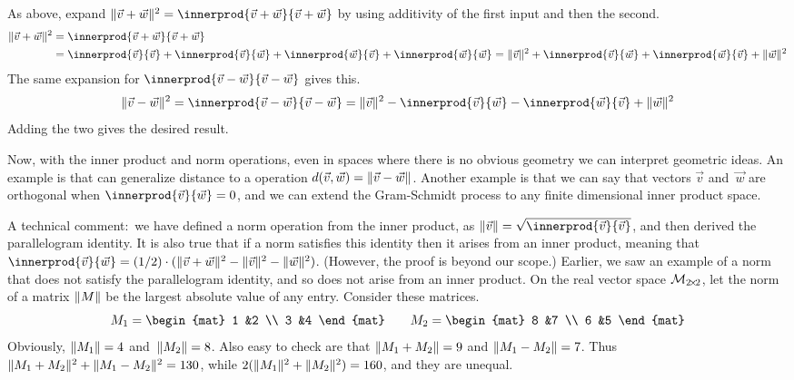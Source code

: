 As above, expand
$
  \norm{\vec{v}+\vec{w}}^2=\innerprod{\vec{v}+\vec{w}}{\vec{v}+\vec{w}}
$
by using additivity of the first input and then the second. 
\begin{align*}
  \norm{\vec{v}+\vec{w}}^2
  &=\innerprod{\vec{v}+\vec{w}}{\vec{v}+\vec{w}}           \\
  &=\innerprod{\vec{v}}{\vec{v}}            
   +\innerprod{\vec{v}}{\vec{w}}
   +\innerprod{\vec{w}}{\vec{v}}
   +\innerprod{\vec{w}}{\vec{w}}
  =\norm{\vec{v}}^2            
   +\innerprod{\vec{v}}{\vec{w}}
   +\innerprod{\vec{w}}{\vec{v}}
   +\norm{\vec{w}}^2
\end{align*}
The same expansion for $\innerprod{\vec{v}-\vec{w}}{\vec{v}-\vec{w}}$
gives this.
\begin{equation*}
  \norm{\vec{v}-\vec{w}}^2
  =\innerprod{\vec{v}-\vec{w}}{\vec{v}-\vec{w}}
  =\norm{\vec{v}}^2
   -\innerprod{\vec{v}}{\vec{w}}
   -\innerprod{\vec{w}}{\vec{v}}
   +\norm{\vec{w}}^2
\end{equation*}
Adding the two gives the desired result. 

Now, with the inner product and norm operations, 
even in spaces where there is no obvious geometry
we can interpret geometric ideas. 
An example is that can generalize distance to a
operation
$d(\vec{v},\vec{w})=\lVert\vec{v}-\vec{w}\rVert$.
Another example is that we can say that
vectors $\vec{v}$ and~$\vec{w}$ are orthogonal when 
$\innerprod{\vec{v}}{\vec{w}}=0$,
and we can extend the Gram-Schmidt process
to any finite dimensional inner product space.

A technical comment:~we have defined a norm operation from the inner product, 
as $\norm{\vec{v}}=\sqrt{\smashdp{\innerprod{\vec{v}}{\vec{v}}}}$,
and then derived the parallelogram identity.
It is also true that if a norm satisfies this identity then it
arises from an inner product, 
meaning that 
$\innerprod{\vec{v}}{\vec{w}}
  =(1/2)\cdot(\norm{\vec{v}+\vec{w}}^2-\norm{\vec{v}}^2-\norm{\vec{w}}^2)$.
(However, the proof is beyond our scope.)
Earlier, we saw an example of a norm that does not satisfy the parallelogram 
identity, 
and so does not arise from an inner product.
On the real vector space $\mathcal{M}_{2 \! \times \! 2}$, let the
norm of a matrix $\lVert M\rVert$ be the largest absolute value of any entry.
Consider these matrices.
\begin{equation*}
  M_1=
  \begin{mat}
  1  &2 \\
  3  &4  
  \end{mat}
  \qquad
  M_2=
  \begin{mat}
  8  &7  \\
  6  &5
  \end{mat}
\end{equation*}
Obviously, $\lVert M_1\rVert=4$ and~$\lVert M_2\rVert=8$.
Also easy to check are that $\lVert M_1+M_2\rVert=9$
and $\lVert M_1-M_2\rVert=7$.
Thus $\lVert M_1+M_2\rVert^2+\lVert M_1-M_2\rVert^2=130$, 
while $2(\lVert M_1\rVert^2+\lVert M_2\rVert^2)=160$,
and they are unequal.

